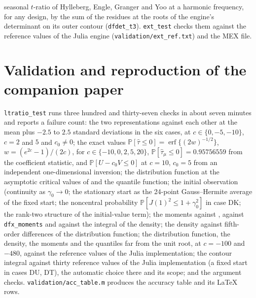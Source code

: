 \documentclass[11pt]{article}
\newcommand{\code}[1]{\texttt{#1}}
\newcommand{\PP}{{\mathbb P}}
\newcommand{\Fk}{\textsf{DK}}
\newcommand{\Fu}{\textsf{DU}}
\newcommand{\Ft}{\textsf{DT}}
\begin{document}
seasonal $t$-ratio of Hylleberg, Engle, Granger and Yoo at a harmonic frequency, for any design, by the sum of the residues at the roots of the engine's determinant on its outer contour (\code{dfdet\_t3}).  \code{ext\_test} checks them against the reference values of the Julia engine (\code{validation/ext\_ref.txt}) and the MEX file.

\section{Validation and reproduction of the companion paper}
\label{sec:validation}

\code{ltratio\_test} runs three hundred and thirty-seven checks in about seven minutes and reports a failure count: the two representations against each other at the mean plus $-2.5$ to $2.5$ standard deviations in the six cases, at $c\in\{0,-5,-10\}$, $c=2$ and $5$ and $c_0\ne0$; the exact values $\PP[\hat\tau\le0]=\operatorname{erf}\{(2w)^{-1/2}\}$, $w=(e^{2c}-1)/(2c)$, for $c\in\{-10,0,2,5,20\}$, $\PP[\hat\tau_\mu\le0]=0.95756559$ from the coefficient statistic, and $\PP[U-c_0V\le0]$ at $c=10$, $c_0=5$ from an independent one-dimensional inversion; the distribution function at the asymptotic critical values of \citet{MacKinnon2010} and the quantile function; the initial observation (continuity as $\gamma_0\to0$; the stationary start as the 24-point Gauss--Hermite average of the fixed start; the noncentral probability $\PP[J(1)^2\le1+\gamma_0^2]$ in case \Fk; the rank-two structure of the initial-value term); the moments against \citet{Nabeya1999}, against \code{dfx\_moments} and against the integral of the density; the density against fifth-order differences of the distribution function; the distribution function, the density, the moments and the quantiles far from the unit root, at $c=-100$ and $-480$, against the reference values of the Julia implementation; the contour integral against thirty reference values of the Julia implementation (a fixed start in cases \Fu, \Ft), the automatic choice there and its scope; and the argument checks.  \code{validation/acc\_table.m} produces the accuracy table and its LaTeX rows.
\end{document}
